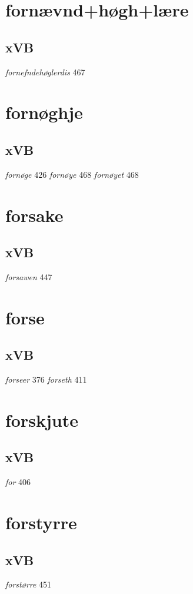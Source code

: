 \documentclass[a4paper,twocolumn]{article}
\begin{document}
\section{fornævnd+høgh+lære}
\label{sec:orgcd0d14b}
\subsection{xVB}
\label{sec:org250fe61}
\emph{fornefndehøglerdis} 467 
\section{fornøghje}
\label{sec:org8bca27b}
\subsection{xVB}
\label{sec:org50437fe}
\emph{fornøge} 426 \emph{fornøye} 468 \emph{fornøyet} 468 
\section{forsake}
\label{sec:org1d662e3}
\subsection{xVB}
\label{sec:org6289c55}
\emph{forsawen} 447 
\section{forse}
\label{sec:org207ac7f}
\subsection{xVB}
\label{sec:org39764f7}
\emph{forseer} 376 \emph{forseth} 411 
\section{forskjute}
\label{sec:org933b1f7}
\subsection{xVB}
\label{sec:orgbabcde6}
\emph{for} 406 
\section{forstyrre}
\label{sec:org373743d}
\subsection{xVB}
\label{sec:org5ac0bbe}
\emph{forstørre} 451 
\end{document}
